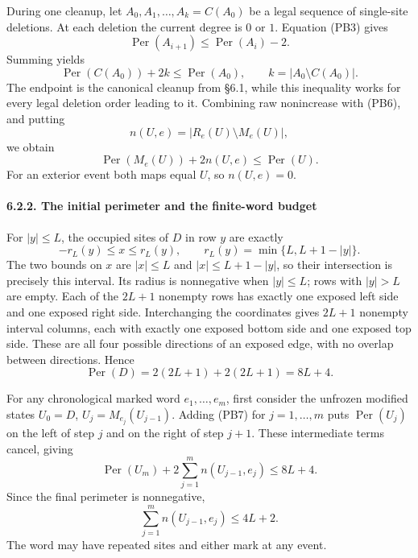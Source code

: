\documentclass[
  11pt,
  a4paper,
]{article}
\begin{document}
During one cleanup, let \(A_0,A_1,\ldots,A_k=C(A_0)\) be a legal
sequence of single-site deletions. At each deletion the current degree
is \(0\) or \(1\). Equation (PB3) gives \[
\operatorname{Per}(A_{i+1})\leq\operatorname{Per}(A_i)-2.
\] Summing yields \[
\operatorname{Per}(C(A_0))+2k\leq\operatorname{Per}(A_0),
\qquad k=|A_0\setminus C(A_0)|.
\tag{PB6}
\] The endpoint is the canonical cleanup from §6.1, while this
inequality works for every legal deletion order leading to it. Combining
raw nonincrease with (PB6), and putting \[
n(U,e)=|R_e(U)\setminus M_e(U)|,
\] we obtain \[
\operatorname{Per}(M_e(U))+2n(U,e)\leq\operatorname{Per}(U).
\tag{PB7}
\] For an exterior event both maps equal \(U\), so \(n(U,e)=0\).

\paragraph{6.2.2. The initial perimeter and the finite-word
budget}\label{the-initial-perimeter-and-the-finite-word-budget}

For \(|y|\leq L\), the occupied sites of \(D\) in row \(y\) are exactly
\[
-r_L(y)\leq x\leq r_L(y),
\qquad r_L(y)=\min\{L,L+1-|y|\}.
\] The two bounds on \(x\) are \(|x|\leq L\) and \(|x|\leq L+1-|y|\), so
their intersection is precisely this interval. Its radius is nonnegative
when \(|y|\leq L\); rows with \(|y|>L\) are empty. Each of the \(2L+1\)
nonempty rows has exactly one exposed left side and one exposed right
side. Interchanging the coordinates gives \(2L+1\) nonempty interval
columns, each with exactly one exposed bottom side and one exposed top
side. These are all four possible directions of an exposed edge, with no
overlap between directions. Hence \[
\operatorname{Per}(D)=2(2L+1)+2(2L+1)=8L+4.
\tag{PB8}
\]

For any chronological marked word \(e_1,\ldots,e_m\), first consider the
unfrozen modified states \(U_0=D\), \(U_j=M_{e_j}(U_{j-1})\). Adding
(PB7) for \(j=1,\ldots,m\) puts \(\operatorname{Per}(U_j)\) on the left
of step \(j\) and on the right of step \(j+1\). These intermediate terms
cancel, giving \[
\operatorname{Per}(U_m)+2\sum_{j=1}^m n(U_{j-1},e_j)\leq8L+4.
\] Since the final perimeter is nonnegative, \[
\sum_{j=1}^m n(U_{j-1},e_j)\leq4L+2.
\tag{PB9}
\] The word may have repeated sites and either mark at any event.
\end{document}
